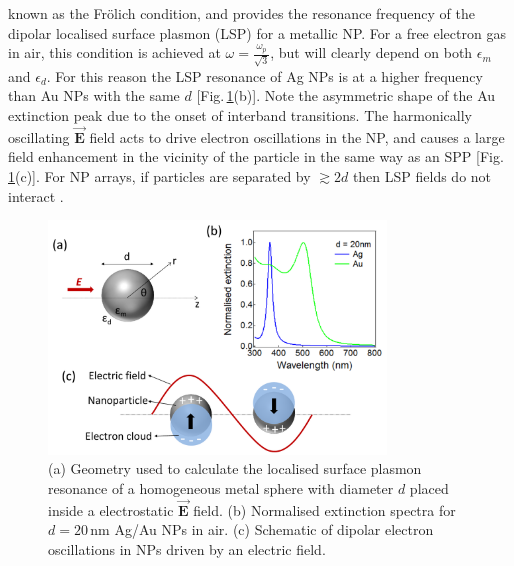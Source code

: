 known as the Fr\"{o}lich condition, and provides the resonance frequency of the dipolar localised surface plasmon (LSP) for a metallic NP. For a free electron gas in air, this condition is achieved at $\omega = \frac{\omega_p}{\sqrt{3}}$, but will clearly depend on both $\epsilon_m$ and $\epsilon_d$. For this reason the LSP resonance of Ag NPs is at a higher frequency than Au NPs with the same $d$ [Fig.\,\ref{3Fig7}(b)]. Note the asymmetric shape of the Au extinction peak due to the onset of interband transitions. The harmonically oscillating $\vec{\mathbf{E}}$ field acts to drive electron oscillations in the NP, and causes a large field enhancement in the vicinity of the particle in the same way as an SPP [Fig.\,\ref{3Fig7}(c)]. For NP arrays, if particles are separated by $\gtrsim2d$ then LSP fields do not interact \cite{Rechberger2003}.
\begin{figure}[h!] 
\centering    
\includegraphics[width=0.8\textwidth]{Fig7}
\caption{(a) Geometry used to calculate the localised surface plasmon resonance of a homogeneous metal sphere with diameter $d$ placed inside a electrostatic $\vec{\mathbf{E}}$ field. (b) Normalised extinction spectra for $d=20$\,nm Ag/Au NPs in air. (c) Schematic of dipolar electron oscillations in NPs driven by an electric field.}
\label{3Fig7}
\end{figure} 

